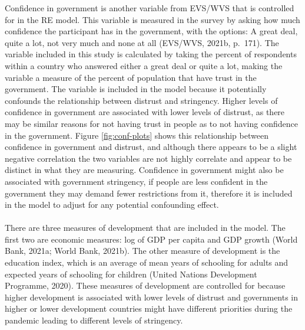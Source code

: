 \documentclass[
  11pt,
]{article}
\begin{document}
Confidence in government is another variable from EVS/WVS that is controlled for in the RE model. This variable is measured in the survey by asking how much confidence the participant has in the government, with the options: A great deal, quite a lot, not very much and none at all (EVS/WVS, 2021b, p.~171). The variable included in this study is calculated by taking the percent of respondents within a country who answered either a great deal or quite a lot, making the variable a measure of the percent of population that have trust in the government. The variable is included in the model because it potentially confounds the relationship between distrust and stringency. Higher levels of confidence in government are associated with lower levels of distrust, as there may be similar reasons for not having trust in people as to not having confidence in the government. Figure \ref{fig:conf-plots} shows this relationship between confidence in government and distrust, and although there appears to be a slight negative correlation the two variables are not highly correlate and appear to be distinct in what they are measuring. Confidence in government might also be associated with government stringency, if people are less confident in the government they may demand fewer restrictions from it, therefore it is included in the model to adjust for any potential confounding effect.\\
~\\
There are three measures of development that are included in the model. The first two are economic measures: log of GDP per capita and GDP growth (World Bank, 2021a; World Bank, 2021b). The other measure of development is the education index, which is an average of mean years of schooling for adults and expected years of schooling for children (United Nations Development Programme, 2020). These measures of development are controlled for because higher development is associated with lower levels of distrust and governments in higher or lower development countries might have different priorities during the pandemic leading to different levels of stringency.\\
~\\
\end{document}
